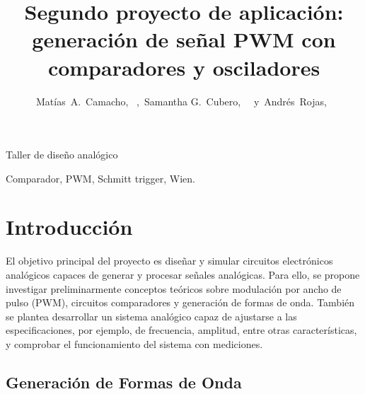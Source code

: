 \documentclass[journal, onecolumn]{IEEEtran}
\begin{document}
\setlength{\parindent}{4.2mm}
%
\title{Segundo proyecto de aplicación: generación de señal PWM con comparadores y osciladores}


\author{Matías~A.~Camacho,~
        ,~Samantha G.~Cubero,~
        ~y~Andrés~Rojas,~
}

%
{Taller de diseño analógico}


\maketitle




\clearpage
\tableofcontents
\clearpage

\begin{IEEEkeywords}
Comparador, PWM, Schmitt trigger, Wien.
\end{IEEEkeywords}


\section{Introducción}

El objetivo principal del proyecto es diseñar y simular circuitos electrónicos analógicos capaces de generar y procesar señales analógicas. Para ello, se propone investigar preliminarmente conceptos teóricos sobre modulación por ancho de pulso (PWM), circuitos
comparadores y generación de formas de onda. También se plantea desarrollar un sistema analógico capaz de ajustarse a las especificaciones, por ejemplo, de frecuencia, amplitud, entre otras características, y comprobar el funcionamiento del sistema con mediciones.

\subsection{Generación de Formas de Onda}
\end{document}
